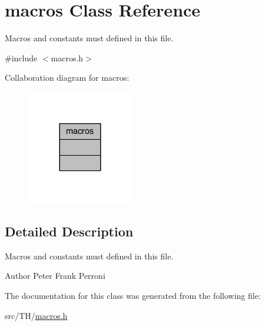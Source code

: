 \hypertarget{classmacros}{}\section{macros Class Reference}
\label{classmacros}


Macros and constants must defined in this file.  




{\ttfamily \#include $<$macros.\+h$>$}



Collaboration diagram for macros\+:
\nopagebreak
\begin{figure}[H]
\begin{center}
\leavevmode
\includegraphics[width=132pt]{classmacros__coll__graph}
\end{center}
\end{figure}


\subsection{Detailed Description}
Macros and constants must defined in this file. 

\begin{DoxyAuthor}{Author}
Peter Frank Perroni 
\end{DoxyAuthor}


The documentation for this class was generated from the following file\+:\begin{DoxyCompactItemize}
\item 
src/\+T\+H/\hyperlink{macros_8h}{macros.\+h}\end{DoxyCompactItemize}
